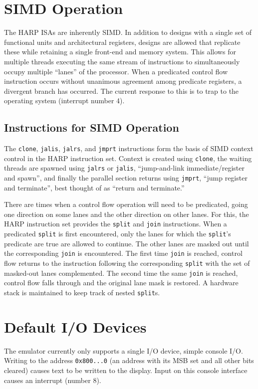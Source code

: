 \documentclass[10pt,letterpaper]{article}
\begin{document}
\section{SIMD Operation}
The HARP ISAs are inherently SIMD.
In addition to designs with a single set of functional units and architectural registers, designs are allowed that replicate these while retaining a single front-end and memory system.
This allows for multiple threads executing the same stream of instructions to simultaneously occupy multiple ``lanes'' of the processor.
When a predicated control flow instruction occurs without unanimous agreement among predicate registers, a divergent branch has occurred.
The current response to this is to trap to the operating system (interrupt number 4).


\subsection{Instructions for SIMD Operation}
The \texttt{clone}, \texttt{jalis}, \texttt{jalrs}, and \texttt{jmprt} instructions form the basis of SIMD context control in the HARP instruction set.
Context is created using \texttt{clone}, the waiting threads are spawned using \texttt{jalrs} or \texttt{jalis}, ``jump-and-link immediate/register and spawn'', and finally the parallel section returns using \texttt{jmprt}, ``jump register and terminate'', best thought of as ``return and terminate.''

There are times when a control flow operation will need to be predicated, going one direction on some lanes and the other direction on other lanes.
For this, the HARP instruction set provides the \texttt{split} and \texttt{join} instructions.
When a predicated \texttt{split} is first encountered, only the lanes for which the \texttt{split}'s predicate are true are allowed to continue.
The other lanes are masked out until the corresponding \texttt{join} is encountered.
The first time \texttt{join} is reached, control flow returns to the instruction following the corresponding \texttt{split} with the set of masked-out lanes complemented.
The second time the same \texttt{join} is reached, control flow falls through and the original lane mask is restored.
A hardware stack is maintained to keep track of nested \texttt{split}s.

\section{Default I/O Devices}
The emulator currently only supports a single I/O device, simple console I/O.
Writing to the address \texttt{0x800...0} (an address with its MSB set and all other bits cleared) causes text to be written to the display.
Input on this console interface causes an interrupt (number 8).
\end{document}
